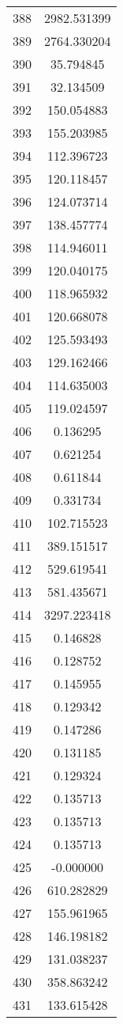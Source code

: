 \documentclass[12pt]{article}
\begin{document}
\begin{longtable}{@{}cc@{}}
388 & 2982.531399 \\
389 & 2764.330204 \\
390 & 35.794845 \\
391 & 32.134509 \\
392 & 150.054883 \\
393 & 155.203985 \\
394 & 112.396723 \\
395 & 120.118457 \\
396 & 124.073714 \\
397 & 138.457774 \\
398 & 114.946011 \\
399 & 120.040175 \\
400 & 118.965932 \\
401 & 120.668078 \\
402 & 125.593493 \\
403 & 129.162466 \\
404 & 114.635003 \\
405 & 119.024597 \\
406 & 0.136295 \\
407 & 0.621254 \\
408 & 0.611844 \\
409 & 0.331734 \\
410 & 102.715523 \\
411 & 389.151517 \\
412 & 529.619541 \\
413 & 581.435671 \\
414 & 3297.223418 \\
415 & 0.146828 \\
416 & 0.128752 \\
417 & 0.145955 \\
418 & 0.129342 \\
419 & 0.147286 \\
420 & 0.131185 \\
421 & 0.129324 \\
422 & 0.135713 \\
423 & 0.135713 \\
424 & 0.135713 \\
425 & -0.000000 \\
426 & 610.282829 \\
427 & 155.961965 \\
428 & 146.198182 \\
429 & 131.038237 \\
430 & 358.863242 \\
431 & 133.615428 \\

\end{longtable}
\end{document}
